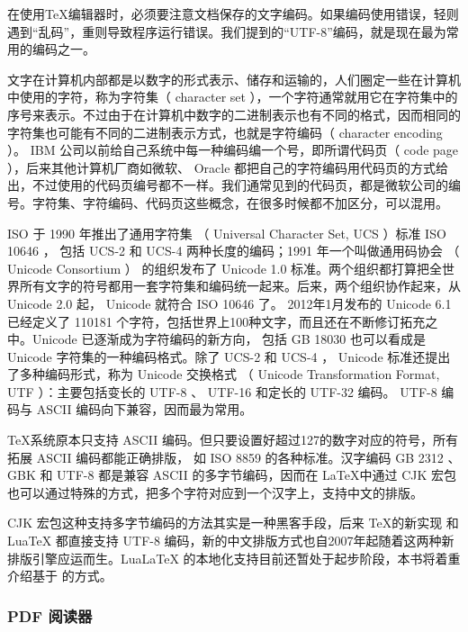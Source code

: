 {
    \qquad 在使用\TeX 编辑器时，必须要注意文档保存的文字编码。如果编码使用错误，轻则遇到“乱码”，重则导致程序运行错误。我们提到的“UTF-8”编码，就是现在最为常用的编码之一。

    \qquad 文字在计算机内部都是以数字的形式表示、储存和运输的，人们圈定一些在计算机中使用的字符，称为字符集（ character set ），一个字符通常就用它在字符集中的序号来表示。不过由于在计算机中数字的二进制表示也有不同的格式，因而相同的字符集也可能有不同的二进制表示方式，也就是字符编码（ character encoding ）。 IBM 公司以前给自己系统中每一种编码编一个号，即所谓代码页（ code page ），后来其他计算机厂商如微软、 Oracle 都把自己的字符编码用代码页的方式给出，不过使用的代码页编号都不一样。我们通常见到的代码页，都是微软公司的编号。字符集、字符编码、代码页这些概念，在很多时候都不加区分，可以混用。

    \qquad ISO 于 1990 年推出了通用字符集 （ Universal Character Set, UCS ）标准 ISO 10646 ， 包括 UCS-2 和 UCS-4 两种长度的编码；1991 年一个叫做通用码协会 （ Unicode Consortium ） 的组织发布了 Unicode 1.0 标准。两个组织都打算把全世界所有文字的符号都用一套字符集和编码统一起来。后来，两个组织协作起来，从 Unicode 2.0 起， Unicode 就符合 ISO 10646 了。 2012年1月发布的 Unicode 6.1 已经定义了 110181 个字符，包括世界上100种文字，而且还在不断修订拓充之中。\footnotemark Unicode 已逐渐成为字符编码的新方向， 包括 GB 18030 也可以看成是 Unicode 字符集的一种编码格式。除了 UCS-2 和 UCS-4 ， Unicode 标准还提出了多种编码形式，称为 Unicode 交换格式 （ Unicode Transformation Format, UTF ）：主要包括变长的 UTF-8 、 UTF-16 和定长的 UTF-32 编码。 UTF-8 编码与 ASCII 编码向下兼容，因而最为常用。

    \qquad \TeX 系统原本只支持 ASCII 编码。但只要设置好超过127的数字对应的符号，所有拓展 ASCII 编码都能正确排版， 如 ISO 8859 的各种标准。汉字编码 GB 2312 、 GBK 和 UTF-8 都是兼容 ASCII 的多字节编码，因而在 \LaTeX 中通过 CJK 宏包 也可以通过特殊的方式，把多个字符对应到一个汉字上，支持中文的排版。

    \qquad CJK 宏包这种支持多字节编码的方法其实是一种黑客手段，后来 \TeX 的新实现 \XeTeX 和 LuaTeX 都直接支持 UTF-8 编码，新的中文排版方式也自2007年起随着这两种新排版引擎应运而生。LuaLaTeX 的本地化支持目前还暂处于起步阶段，本书将着重介绍基于 \XeTeX 的方式。
    }


\subsubsection{PDF 阅读器}

